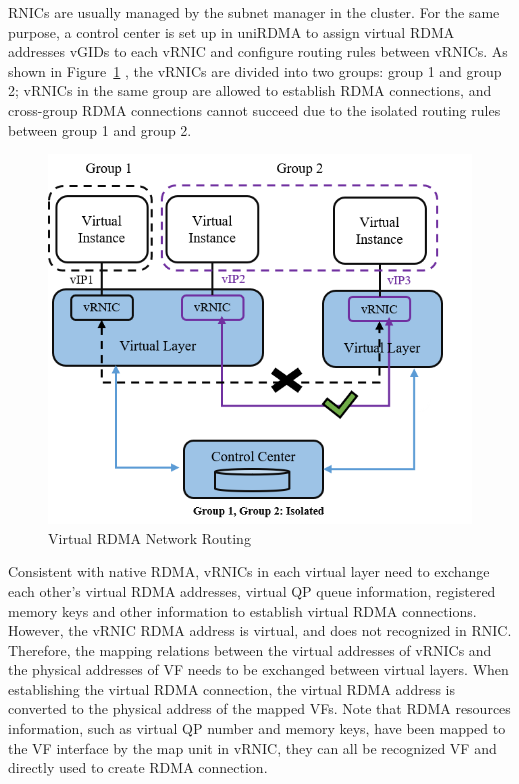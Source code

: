 RNICs are usually managed by the subnet manager in the cluster. For the same purpose, a control center is set up in uniRDMA to assign virtual RDMA addresses vGIDs to each vRNIC and configure routing rules between vRNICs. As shown in Figure~\ref{fig:route-config} , the vRNICs are divided into two groups: group 1 and group 2; vRNICs in the same group are allowed to establish RDMA connections, and cross-group RDMA connections cannot succeed due to the isolated routing rules between group 1 and group 2.

\begin{figure}[!ht]
	\centering
	\includegraphics[width=1.0\linewidth]{images/route-config}
	\caption{Virtual RDMA Network Routing}
	\label{fig:route-config}
\end{figure}

Consistent with native RDMA, vRNICs in each virtual layer need to exchange each other's virtual RDMA addresses, virtual QP queue information, registered memory keys and other information to establish virtual RDMA connections. However, the vRNIC RDMA address is virtual, and does not recognized in RNIC. Therefore, the mapping relations between the virtual addresses of vRNICs and the physical addresses of VF needs to be exchanged between virtual layers. When establishing the virtual RDMA connection, the virtual RDMA address is converted to the physical address of the mapped VFs. Note that RDMA resources information, such as virtual QP number and memory keys, have been mapped to the VF interface by the map unit in vRNIC, they can all be recognized VF and directly used to create RDMA connection.

